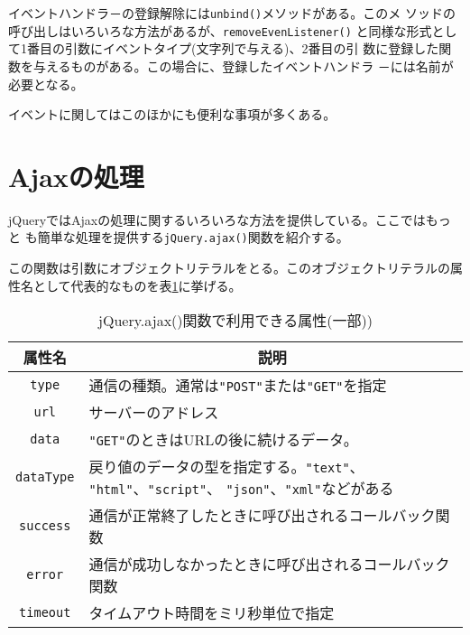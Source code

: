 イベントハンドラ－の登録解除には\texttt{unbind()}メソッドがある。このメ
ソッドの呼び出しはいろいろな方法があるが、\texttt{removeEvenListener()}
と同様な形式として1番目の引数にイベントタイプ(文字列で与える)、2番目の引
数に登録した関数を与えるものがある。この場合に、登録したイベントハンドラ
－には名前が必要となる。

イベントに関してはこのほかにも便利な事項が多くある。
\section{Ajaxの処理}
jQueryではAjaxの処理に関するいろいろな方法を提供している。ここではもっと
も簡単な処理を提供する\texttt{jQuery.ajax()}関数を紹介する。

この関数は引数にオブジェクトリテラルをとる。このオブジェクトリテラルの属
性名として代表的なものを表\ref{jQueryAjax}に挙げる。
\begin{table}[ht]
 \caption{jQuery.ajax()関数で利用できる属性(一部))}\label{jQueryAjax}
\begin{center}
 \begin{tabular}{|c|m{}|}\hline
属性名  &\multicolumn{1}{c|}{説明} \\\hline
  \texttt{type}&通信の種類。通常は\texttt{"POST"}または\texttt{"GET"}を指定\\
  \hline
  \texttt{url}&サーバーのアドレス\\ \hline
  \texttt{data}&\texttt{"GET"}のときはURLの後に続けるデータ。
      \\ \hline
  \texttt{dataType}&戻り値のデータの型を指定する。\texttt{"text"}、
      \texttt{"html"}、\texttt{"script"}、      
\texttt{"json"}、\texttt{"xml"}などがある\\ \hline
\texttt{success}&通信が正常終了したときに呼び出されるコールバック関数
      \\ \hline
\texttt{error}&通信が成功しなかったときに呼び出されるコールバック関数
      \\ \hline
  \texttt{timeout}&タイムアウト時間をミリ秒単位で指定\\ \hline
 \end{tabular}
\end{center}
\end{table}

